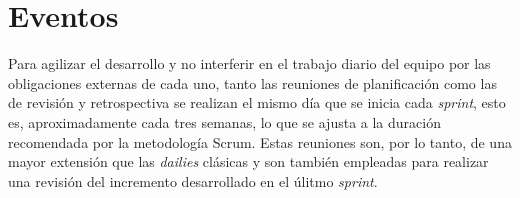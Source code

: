 \section{Eventos}
\label{sec:metodologia_eventos}

Para agilizar el desarrollo y no interferir en el trabajo diario del equipo por las obligaciones
externas de cada uno, tanto las reuniones de planificación como las de revisión y retrospectiva se realizan
el mismo día que se inicia cada \textit{sprint}, esto es, aproximadamente cada tres semanas, lo que se ajusta a la duración recomendada
por la metodología Scrum. Estas reuniones son, por lo tanto, de una mayor extensión que las \textit{dailies} clásicas y son también empleadas
para realizar una revisión del incremento desarrollado en el úlitmo \textit{sprint}.
